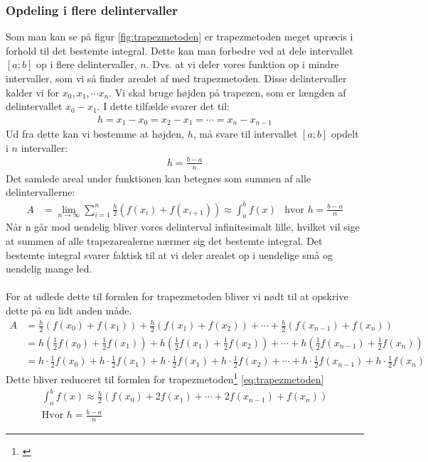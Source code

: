 \documentclass[12pt]{article}
\numberwithin{equation}{section}
\begin{document}
\subsubsection{Opdeling i flere delintervaller}
\label{sec:opdelingtrapezmetoden}
Som man kan se på figur \ref{fig:trapezmetoden} er trapezmetoden meget upræcis i forhold til det bestemte integral. Dette kan man forbedre ved at dele intervallet $[a;b]$ op i flere delintervaller, $n$. Dvs. at vi deler vores funktion op i mindre intervaller, som vi så finder arealet af med trapezmetoden. Disse delintervaller kalder vi for $x_0, x_1, \cdots x_n$. Vi skal bruge højden på trapezen, som er længden af delintervallet $x_0 - x_1$. I dette tilfælde svarer det til:
\begin{align}
h = x_1-x_0 = x_2-x_1 = \cdots = x_n - x_{n-1}
\end{align}
Ud fra dette kan vi bestemme at højden, $h$, må svare til intervallet $[a;b]$ opdelt i $n$ intervaller:
\begin{align}
h=\frac{b-a}{n}
\end{align}
Det samlede areal under funktionen kan betegnes som summen af alle delintervallerne:
\begin{align}
A &= \lim\limits_{n \rightarrow \infty} \sum_{i=1}^{n} \frac{h}{2}(f(x_{i}) + f(x_{i+1}))
\approx \int_{a}^{b}f(x) &\text{hvor }h=\frac{b-a}{n}
\end{align}
Når n går mod uendelig bliver vores delinterval infinitesimalt lille, hvilket vil sige at summen af alle trapezarealerne nærmer sig det bestemte integral. Det bestemte integral svarer faktisk til at vi deler arealet op i uendelige små og uendelig mange led.
\\\\
For at udlede dette til formlen for trapezmetoden bliver vi nødt til at opskrive dette på en lidt anden måde.
\begin{align}
A &= \frac{h}{2}(f(x_0)+ f(x_1)) + \frac{h}{2}(f(x_1)+ f(x_2)) + \cdots + \frac{h}{2}(f(x_{n-1})+ f(x_n)) \nonumber
\\ &= h(\frac{1}{2}f(x_0) + \frac{1}{2}f(x_1)) + h(\frac{1}{2}f(x_1) + \frac{1}{2}f(x_2)) + \cdots + h(\frac{1}{2}f(x_{n-1}) + \frac{1}{2}f(x_n)) \nonumber
\\ &= h \cdot \frac{1}{2}f(x_0) + h \cdot \frac{1}{2}f(x_1) + h \cdot \frac{1}{2}f(x_1) + h \cdot \frac{1}{2}f(x_2) + \cdots + h \cdot \frac{1}{2}f(x_{n-1}) + h \cdot \frac{1}{2}f(x_n) \nonumber
\end{align}
Dette bliver reduceret til formlen for trapezmetoden\footnote{\cite[s. 14]{2012matA}} \eqref{eq:trapezmetoden}
\begin{align}
\label{eq:trapezmetoden}
\boxed{\int_{a}^{b}f(x) \approx \frac{h}{2}(f(x_0) + 2f(x_1) + \cdots + 2f(x_{n-1}) + f(x_n))} \\ \text{Hvor } h=\frac{b-a}{n} \nonumber
\end{align}
\end{document}
